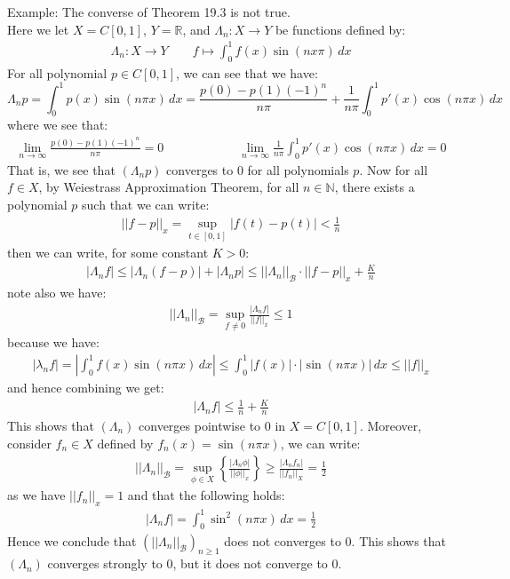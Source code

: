 \documentclass[11pt]{book}
\theoremstyle{break}
\theoremstyle{break}
\newcommand{\R}{\mathbb{R}}
\newcommand{\N}{\mathbb{N}}
\newcommand{\example}{\color{green}Example: \color{black}}
\begin{document}
\example The converse of Theorem 19.3 is not true. \\
Here we let $X = C[0,1]$, $Y = \R$, and $\Lambda_n:X \to Y$ be functions defined by:
\begin{align*}
\Lambda_n : X \to Y \qquad f\mapsto \int_0^1 f(x) \sin(n x \pi) \, dx 
\end{align*}
For all polynomial $p \in C[0,1]$, we can see that we have: 
$$\Lambda_n p = \int_0^1 p(x) \sin(n \pi x ) \, dx = \frac{p(0) - p(1)(-1)^n}{n\pi} + \frac{1}{n\pi}\int_0^1 p'(x) \cos(n\pi x) \, dx$$
where we see that:
\begin{align*}
\lim_{n\to \infty}\frac{p(0) - p(1)(-1)^n}{n\pi}  = 0 \qquad\qquad\qquad  \lim_{n\to \infty}\frac{1}{n\pi}\int_0^1 p'(x) \cos(n\pi x) \, dx  = 0
\end{align*}
That is, we see that $(\Lambda_n p)$ converges to $0$ for all polynomials $p$. Now for all $f \in X$, by Weiestrass Approximation Theorem, for all $n \in \N$, there exists a polynomial $p$ such that we can write:
\begin{align*}
||f - p||_x = \sup_{t\in [0,1]}|f(t) - p(t)| < \frac{1}{n}
\end{align*}
then we can write, for some constant $K > 0$:
\begin{align*}
|\Lambda_n f| \leq |\Lambda_n (f-p)| + |\Lambda_n p| \leq ||\Lambda_n ||_{\mathcal{B}} \cdot ||f-p||_x + \frac{K}{n}
\end{align*}
note also we have:
\begin{align*}
||\Lambda_n ||_{\mathcal{B}} = \sup_{f \neq 0} \frac{|\Lambda_n f|}{||f||_x}\leq 1
\end{align*}
because we have:
\begin{align*}
|\lambda_n f| = \left|\int_0^1 f(x) \sin(n\pi x) \, dx\right| \leq \int_0^1 |f(x)|\cdot |\sin(n \pi x)| \, dx \leq ||f||_x
\end{align*}
and hence combining we get:
\begin{align*}
|\Lambda_n f| \leq \frac{1}{n}+\frac{K}{n}
\end{align*}
This shows that $(\Lambda_n)$ converges pointwise to $0$ in $X = C[0,1]$. Moreover, consider $f_n \in X$ defined by $f_n(x) = \sin(n\pi x)$, we can write:
\begin{align*}
||\Lambda_n ||_{\mathcal{B}} = \sup_{\phi \in X}\left\{ \frac{|\Lambda_n \phi|}{||\phi||_x}\right\} \geq \frac{|\Lambda_n f_n|}{||f_n||_X} = \frac{1}{2}
\end{align*}
as we have $||f_n||_x = 1$ and that the following holds:
\begin{align*}
|\Lambda_n f| = \int_0^1 \sin^2(n \pi x) \, dx = \frac{1}{2}
\end{align*}
Hence we conclude that $(||\Lambda_n||_{\mathcal{B}})_{n \geq 1}$ does not converges to $0$. This shows that $(\Lambda_n)$ converges strongly to $0$, but it does not converge to $0$. \\
\end{document}
